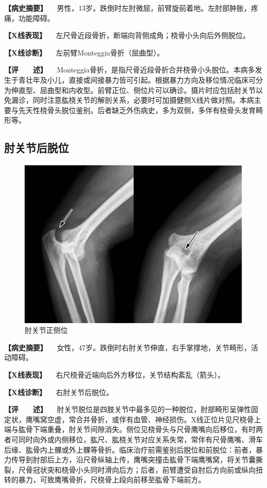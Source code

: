 \textbf{【病史摘要】}
　男性，13岁。跌倒时左肘微屈，前臂旋前着地。左肘部肿胀，疼痛，功能障碍。

\textbf{【X线表现】}
　左尺骨近段骨折，断端向背侧成角；桡骨小头向后外侧脱位。

\textbf{【X线诊断】} 　左前臂Monteggia骨折（屈曲型）。

\textbf{【评　　述】}
　Monteggia骨折，是指尺骨近段骨折合并桡骨小头脱位。本病多发生于青壮年及小儿，直接或间接暴力皆可引起。根据暴力方向及移位情况临床可分为伸直型、屈曲型和内收型。前臂正位、侧位片可以确诊。摄片时应包括肘关节以免漏诊，同时注意肱桡关节的解剖关系，必要时可加摄健侧X线片做对照。本病主要与先天性桡骨头脱位鉴别。后者缺乏外伤病史，多为双侧，多伴有桡骨头发育畸形等。

\subsection{肘关节后脱位}

\begin{figure}[!htbp]
 \centering
 \includegraphics{./images/Image00035.jpg}
 \captionsetup{justification=centering}
 \caption{肘关节正侧位}
 \label{fig2-3-8}
  \end{figure} 

\textbf{【病史摘要】}
　女性，47岁。跌倒时右肘关节伸直，右手掌撑地，关节畸形，活动障碍。

\textbf{【X线表现】} 　右尺桡骨近端向后外方移位，关节结构紊乱（箭头）。

\textbf{【X线诊断】} 　右肘关节后脱位。

\textbf{【评　　述】}
　肘关节脱位是四肢关节中最多见的一种脱位，肘部畸形呈弹性固定状，鹰嘴窝空虚，常合并骨折，或伴有血管、神经损伤。X线正位片见尺桡骨上端与肱骨下端重叠，肘关节间隙消失。侧位见桡骨头与尺骨鹰嘴向后移位，有时两者可同时向外或内侧移位，肱尺、肱桡关节对应关系失常，常伴有尺骨鹰嘴、滑车后缘、肱骨内上髁或外上髁等骨折。临床治疗前需鉴别后脱位和前脱位：前者，暴力传导到肘部后上方，沿尺骨纵轴上传，鹰嘴突撞击肱骨下端鹰嘴窝，将关节囊撕裂，尺骨冠状突和桡骨小头同时滑向后方；后者，前臂遭受自肘后方向前或纵向扭转的暴力，可致鹰嘴骨折，尺桡骨上段向前移至肱骨下端前方。


